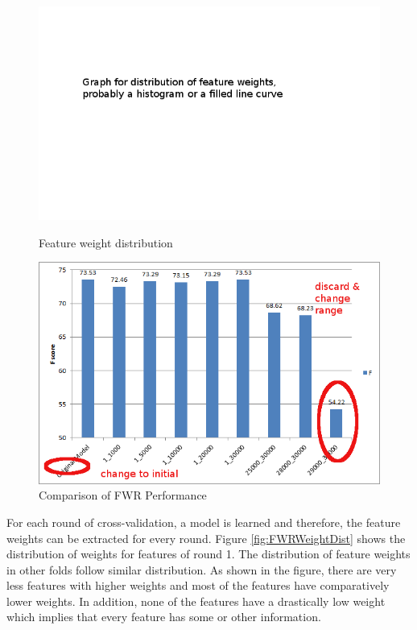 \begin{figure}
\centering
\begin{minipage}{.5\textwidth}
  \centering
  \includegraphics[width=.95\textwidth]{figures/FWRWeightDist.png}
  \caption{Feature weight distribution}
  \label{fig:FWRWeightDist}
\end{minipage}%
\begin{minipage}{.5\textwidth}
  \centering
  \includegraphics[width=.95\textwidth]{figures/FWRPerformance.png}
  \caption{Comparison of FWR Performance}
  \label{fig:FWRPerfComp}
\end{minipage}
\end{figure} 

For each round of cross-validation, a model is learned and therefore, the feature weights can be extracted for every round. Figure \ref{fig:FWRWeightDist} shows the distribution of weights for features of round 1. The distribution of feature weights in other folds follow similar distribution. As shown in the figure, there are very less features with higher weights and most of the features have comparatively lower weights. In addition, none of the features have a drastically low weight which implies that every feature has some or other information.

